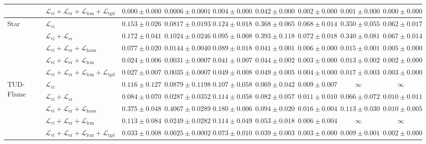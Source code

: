 \begin{table}[htbp]
\begin{tiny}
\begin{tabular}{|l|l|ccc|cc|cc|}
    & $\mathcal{L}_\mathrm{vi} + \mathcal{L}_\mathrm{er} + \mathcal{L}_\mathrm{lcm} + \mathcal{L}_\mathrm{tgd}$ & $\mathbf{0.000 \pm 0.000}$ & $\mathbf{0.0006 \pm 0.0001}$ & $\mathbf{0.004 \pm 0.000}$ & $\mathbf{0.042 \pm 0.000}$ & $\mathbf{0.002 \pm 0.000}$ & $\mathbf{0.001 \pm 0.000}$ & $\mathbf{0.000 \pm 0.000}$\\
    \midrule
    \multirow{5}{*}{Star} & $\mathcal{L}_\mathrm{vi}$ & $0.153 \pm 0.026$ & $0.0817 \pm 0.0193$ & $0.124 \pm 0.018$ & $0.368 \pm 0.065$ & $0.068 \pm 0.014$ & $0.350 \pm 0.055$ & $0.062 \pm 0.017$\\
    & $\mathcal{L}_\mathrm{vi} + \mathcal{L}_\mathrm{er}$ & $0.172 \pm 0.041$ & $0.1024 \pm 0.0246$ & $0.095 \pm 0.008$ & $0.393 \pm 0.118$ & $0.072 \pm 0.018$ & $0.340 \pm 0.081$ & $0.067 \pm 0.014$\\
    & $\mathcal{L}_\mathrm{vi} + \mathcal{L}_\mathrm{er} + \mathcal{L}_\mathrm{haus}$ & $0.077 \pm 0.020$ & $0.0144 \pm 0.0040$ & $0.089 \pm 0.018$ & $\mathbf{0.041 \pm 0.001}$ & $0.006 \pm 0.000$ & $0.015 \pm 0.001$ & $0.005 \pm 0.000$\\
    & $\mathcal{L}_\mathrm{vi} + \mathcal{L}_\mathrm{er} + \mathcal{L}_\mathrm{lcm}$ & $\mathbf{0.024 \pm 0.006}$ & $\mathbf{0.0031 \pm 0.0007}$ & $\mathbf{0.041 \pm 0.007}$ & $0.044 \pm 0.002$ & $\mathbf{0.003 \pm 0.000}$ & $\mathbf{0.013 \pm 0.002}$ & $\mathbf{0.002 \pm 0.000}$\\
    & $\mathcal{L}_\mathrm{vi} + \mathcal{L}_\mathrm{er} + \mathcal{L}_\mathrm{lcm} + \mathcal{L}_\mathrm{tgd}$ & $0.027 \pm 0.007$ & $0.0035 \pm 0.0007$ & $0.049 \pm 0.008$ & $0.049 \pm 0.005$ & $0.004 \pm 0.000$ & $0.017 \pm 0.003$ & $0.003 \pm 0.000$\\
    \midrule
    \multirow{5}{*}{TUD-Flame} & $\mathcal{L}_\mathrm{vi}$ & $0.116 \pm 0.127$ & $0.0879 \pm 0.1198$ & $0.107 \pm 0.058$ & $0.069 \pm 0.042$ & $0.009 \pm 0.007$ & $\infty$ & $\infty$\\
    & $\mathcal{L}_\mathrm{vi} + \mathcal{L}_\mathrm{er}$ & $0.084 \pm 0.070$ & $0.0287 \pm 0.0352$ & $0.114 \pm 0.058$ & $0.082 \pm 0.057$ & $0.011 \pm 0.010$ & $0.066 \pm 0.072$ & $0.010 \pm 0.011$\\
     & $\mathcal{L}_\mathrm{vi} + \mathcal{L}_\mathrm{er} + \mathcal{L}_\mathrm{haus}$ & $0.375 \pm 0.048$ & $0.4067 \pm 0.0289$ & $0.180 \pm 0.006$ & $0.094 \pm 0.020$ & $0.016 \pm 0.004$ & $0.113 \pm 0.030$ & $0.010 \pm 0.005$\\
    & $\mathcal{L}_\mathrm{vi} + \mathcal{L}_\mathrm{er} + \mathcal{L}_\mathrm{lcm}$ & $0.113 \pm 0.084$ & $0.0249 \pm 0.0282$ & $0.114 \pm 0.049$ & $0.053 \pm 0.018$ & $0.006 \pm 0.004$ & $\infty$ & $\infty$\\
    & $\mathcal{L}_\mathrm{vi} + \mathcal{L}_\mathrm{er} + \mathcal{L}_\mathrm{lcm} + \mathcal{L}_\mathrm{tgd}$ & $\mathbf{0.033 \pm 0.008}$ & $\mathbf{0.0025 \pm 0.0002}$ & $\mathbf{0.073 \pm 0.010}$ & $\mathbf{0.039 \pm 0.003}$ & $\mathbf{0.003 \pm 0.000}$ & $\mathbf{0.009 \pm 0.001}$ & $\mathbf{0.002 \pm 0.000}$\\
    \bottomrule
    \end{tabular}
    \end{tiny}
\end{table}

